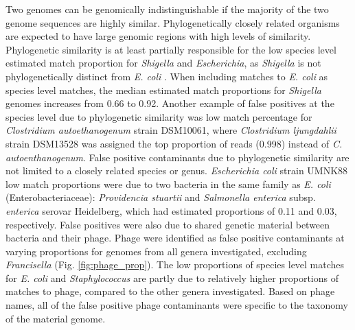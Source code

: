 \documentclass[fleqn,10pt,lineno]{wlpeerj}\usepackage[]{graphicx}\usepackage[]{color}
\begin{document}
Two genomes can be genomically indistinguishable if the majority of the two genome sequences are highly similar. 
Phylogenetically closely related organisms are expected to have large genomic regions with high levels of similarity.
Phylogenetic similarity is at least partially responsible for the low species level estimated match proportion for  \textit{Shigella} and \textit{Escherichia}, as \textit{Shigella} is not phylogenetically distinct from \textit{E. coli} \citep{lan2002escherichia}.
When including matches to \textit{E. coli} as species level matches, the median estimated match proportions for \textit{Shigella} genomes increases from 0.66 to 0.92.
Another example of false positives at the species level due to phylogenetic similarity was low match percentage for \textit{Clostridium autoethanogenum} strain DSM10061, where \textit{Clostridium ljungdahlii} strain DSM13528 was assigned the top proportion of reads (0.998) instead of \textit{C. autoenthanogenum}.
False positive contaminants due to phylogenetic similarity are not limited to a closely related species or genus.
\textit{Escherichia coli} strain UMNK88 low match proportions were due to two bacteria in the same family as \textit{E. coli}
(Enterobacteriaceae): \textit{Providencia stuartii} and \textit{Salmonella enterica} subsp. \textit{enterica} serovar Heidelberg, which had estimated proportions of 0.11 and 0.03, respectively.
False positives were also due to shared genetic material between bacteria and their phage.
Phage were identified as false positive contaminants at varying proportions for genomes from all genera investigated, excluding \textit{Francisella} (Fig. \ref{fig:phage_prop}).
The low proportions of species level matches for \textit{E. coli} and \textit{Staphylococcus} are partly due to relatively higher proportions of matches to phage, compared to the other genera investigated.
Based on phage names, all of the false positive phage contaminants were specific to the taxonomy of the material genome.
\end{document}
